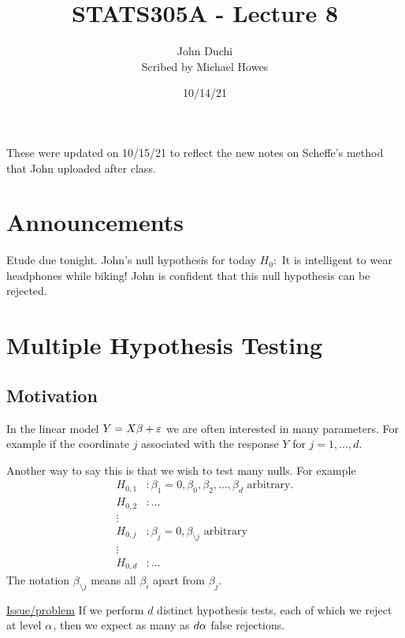 




\title{STATS305A - Lecture 8}
\author{John Duchi\\ Scribed by Michael Howes}
\date{10/14/21}

\pagestyle{fancy}
\fancyhf{}


\maketitle
These were updated on 10/15/21 to reflect the new notes on Scheffe's method that John uploaded after class.
\tableofcontents
\section{Announcements}
Etude due tonight. 
John's null hypothesis for today $H_0:$ It is intelligent to wear headphones while biking! John is confident that this null hypothesis can be rejected.
\section{Multiple Hypothesis Testing}
\subsection{Motivation}
In the linear model $Y=X\beta + \varepsilon$ we are often interested in many parameters. For example if the coordinate $j$ associated with the response $Y$ for $j=1,\ldots,d$.

Another way to say this is that we wish to test many nulls. For example
\begin{align*}
    H_{0,1} &: \beta_1 = 0, \beta_0, \beta_2,\ldots, \beta_d \text{ arbitrary}.\\
    H_{0,2} &: \ldots\\
    \vdots &  \\
    H_{0,j} &: \beta_j = 0, \beta_{\setminus j} \text{ arbitrary}\\
    \vdots & \\
    H_{0,d}&:\ldots
\end{align*}
The notation $\beta_{\setminus j}$ means all $\beta_i$ apart from $\beta_j$. 

\underline{Issue/problem} If we perform $d$ distinct hypothesis tests, each of which we reject at level ${\alpha}$, then we expect as many as $d{\alpha}$ false rejections.

